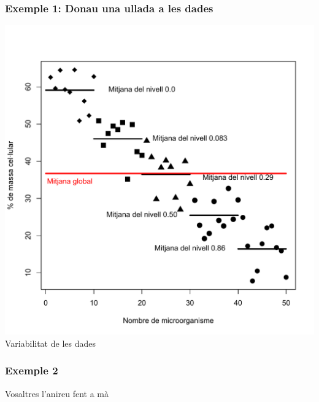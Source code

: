 \documentclass[12pt,t]{beamer}
\theoremstyle{plain}
\theoremstyle{definition}
\begin{document}
\begin{frame}
\frametitle{Exemple 1: Donau una ullada a les dades}
\vspace*{-8ex}

\begin{center}
\includegraphics[width=0.8\linewidth]{varCO2-1.pdf}\\
Variabilitat de les dades
\end{center}

\end{frame}


\begin{frame}
\frametitle{Exemple 2}
\vspace*{2cm}

Vosaltres l'anireu fent a mà  {\Large \smiley}

\end{frame}
\end{document}
